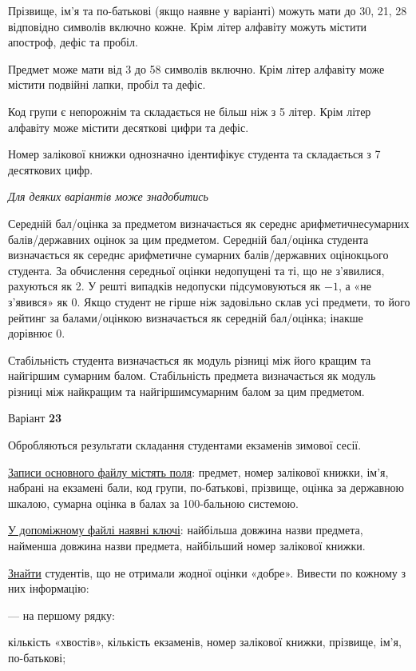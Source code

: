 \documentclass[11pt, ukrainian]{article}
\begin{document}
Прізвище, ім’я та по-батькові (якщо наявне у варіанті) можуть мати до 30, 21, 28 відповідно символів включно кожне. 
Крім літер алфавіту можуть містити апостроф, дефіс та пробіл.

Предмет може мати від 3 до 58 символів включно. 
Крім літер алфавіту може містити подвійні лапки, пробіл та дефіс.

Код групи є непорожнім та складається не більш ніж з 5 літер. 
Крім літер алфавіту може містити десяткові цифри та дефіс.


Номер залікової книжки однозначно ідентифікує студента та складається з 7 десяткових цифр. 

\bigskip\textit{Для деяких варіантів може знадобитись}

Середній бал/оцінка за предметом визначається як середнє арифметичнесумарних балів/державних оцінок за цим предметом. 
Середній бал/оцінка студента визначається як середнє арифметичне сумарних балів/державних оцінокцього студента. 
За обчислення середньої оцінки недопущені та ті, що не з’явилися, рахуються як 2.
У решті випадків недопуски підсумовуються як $-1$, а «не з’явився» як 0.
Якщо студент не гірше ніж задовільно склав усі предмети, 
то його рейтинг за балами/оцінкою визначається як середній бал/оцінка; інакше дорівнює 0.

Стабільність студента визначається як модуль різниці між його кращим та найгіршим сумарним балом.
Стабільність предмета визначається як модуль різниці між найкращим та найгіршимсумарним балом за цим предметом.




\par
\newpage
{\center Варіант  \No \textbf { 23 }\par}
\bigskip
Обробляються результати складання студентами екзаменів зимової сесії.

\underline{Записи основного файлу містять поля}: предмет, номер залікової книжки, ім’я, набрані на екзамені бали, код групи, по-батькові, прізвище, оцінка за державною шкалою, сумарна оцінка в балах за 100-бальною системою.

\underline{У допоміжному файлі наявні ключі}: найбільша довжина назви предмета, найменша довжина назви предмета, найбільший номер залікової книжки.

\underline{Знайти} студентів, що не отримали жодної оцінки «добре». Вивести по кожному з них інформацію:\par
{\noindent}--- на першому рядку:\par
кількість «хвостів», кількість екзаменів, номер залікової книжки, прізвище, ім’я, по-батькові;
\end{document}
